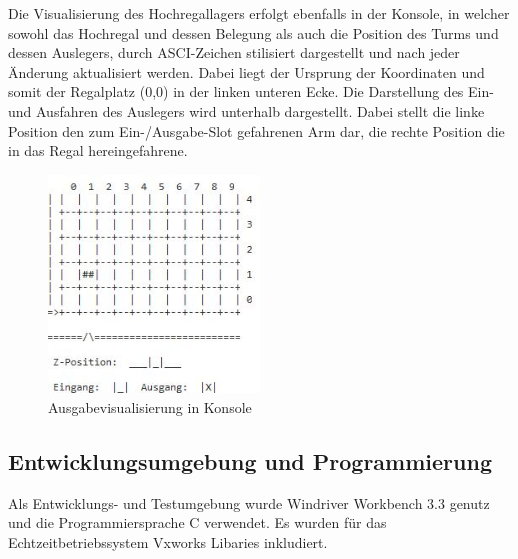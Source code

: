 Die Visualisierung des Hochregallagers erfolgt ebenfalls in der Konsole, in welcher sowohl das Hochregal und dessen Belegung als auch die Position des Turms und dessen Auslegers, durch ASCI-Zeichen stilisiert dargestellt und nach jeder Änderung aktualisiert werden.
Dabei liegt der Ursprung der Koordinaten und somit der Regalplatz (0,0) in der linken unteren Ecke.
Die Darstellung des Ein- und Ausfahren des Auslegers wird unterhalb dargestellt. Dabei stellt die linke Position den zum Ein-/Ausgabe-Slot gefahrenen Arm dar, die rechte Position die in das Regal hereingefahrene.
\begin{figure}[H]
	\centering
  \includegraphics[width=0.5\textwidth]{diagrams/console_output.JPG}
	\caption{Ausgabevisualisierung in Konsole}
	\label{fig3}
\end{figure}

\subsection{Entwicklungsumgebung und Programmierung}
Als Entwicklungs- und Testumgebung wurde Windriver Workbench 3.3 genutz und die Programmiersprache C verwendet.
Es wurden für das Echtzeitbetriebssystem Vxworks Libaries inkludiert.


